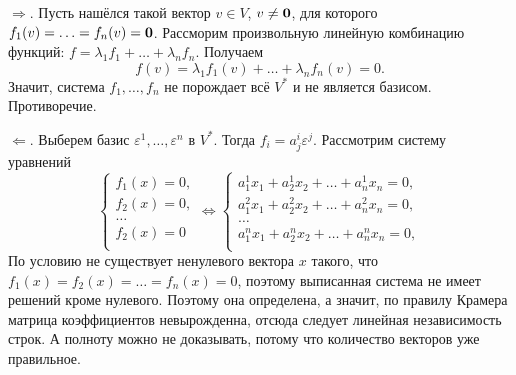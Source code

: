 \begin{solution}
    $\Rightarrow$. Пусть нашёлся такой вектор $v \in V$, $v \ne \boldsymbol{0}$, для которого $f_1(v) = \ldots = f_n(v) = \boldsymbol{0}$. Рассморим произвольную линейную комбинацию функций: $f = \lambda_1f_1 + \ldots + \lambda_nf_n$. Получаем
    \[
        f(v) = \lambda_1f_1(v) + \ldots + \lambda_nf_n(v) = 0.
    \]
    Значит, система $f_1, \ldots, f_n$ не порождает всё $V^\ast$ и не является базисом. Противоречие.

    $\Leftarrow$. Выберем базис $\varepsilon^1, \ldots, \varepsilon^n$ в $V^\ast$. Тогда $f_i = a^i_j\varepsilon^j$. Рассмотрим систему уравнений
    \[
        \begin{cases}
            f_1(x) = 0,\\
            f_2(x) = 0,\\
            \ldots\\
            f_2(x) = 0\\
        \end{cases} \Leftrightarrow
        \begin{cases}
            a^1_1x_1 + a^1_2x_2 + \ldots + a^1_nx_n = 0,\\
            a^2_1x_1 + a^2_2x_2 + \ldots + a^2_nx_n = 0,\\
            \ldots\\
            a^n_1x_1 + a^n_2x_2 + \ldots + a^n_nx_n = 0,\\
        \end{cases}
    \]
    По условию не существует ненулевого вектора $x$ такого, что $f_1(x) = f_2(x) = \ldots = f_n(x) = 0$, поэтому выписанная система не имеет решений кроме нулевого. Поэтому она определена, а значит, по правилу Крамера матрица коэффициентов невырожденна, отсюда следует линейная независимость строк. А полноту можно не доказывать, потому что количество векторов уже правильное.
\end{solution}


